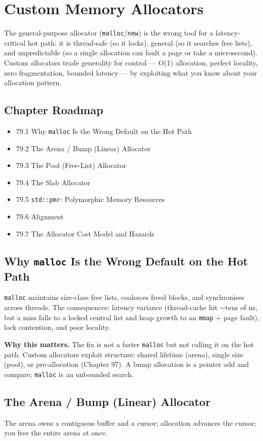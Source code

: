 \chapter{Custom Memory Allocators}

The general-purpose allocator (\texttt{malloc}/\texttt{new}) is the wrong tool for a latency-critical hot path: it is thread-safe (so it locks), general (so it searches free lists), and unpredictable (so a single allocation can fault a page or take a microsecond). Custom allocators trade generality for control --- O(1) allocation, perfect locality, zero fragmentation, bounded latency --- by exploiting what you know about your allocation pattern.

\section*{Chapter Roadmap}
\begin{itemize}
\item 79.1 Why \texttt{malloc} Is the Wrong Default on the Hot Path
\item 79.2 The Arena / Bump (Linear) Allocator
\item 79.3 The Pool (Free-List) Allocator
\item 79.4 The Slab Allocator
\item 79.5 \texttt{std::pmr}: Polymorphic Memory Resources
\item 79.6 Alignment
\item 79.7 The Allocator Cost Model and Hazards
\end{itemize}

\section{Why \texttt{malloc} Is the Wrong Default on the Hot Path}
\texttt{malloc} maintains size-class free lists, coalesces freed blocks, and synchronises across threads. The consequences: latency variance (thread-cache hit $\sim$tens of ns, but a miss falls to a locked central list and heap growth to an \texttt{mmap} + page fault), lock contention, and poor locality.

\textbf{Why this matters.} The fix is not a faster \texttt{malloc} but not calling it on the hot path. Custom allocators exploit structure: shared lifetime (arena), single size (pool), or pre-allocation (Chapter 97). A bump allocation is a pointer add and compare; \texttt{malloc} is an unbounded search.

\section{The Arena / Bump (Linear) Allocator}
The arena owns a contiguous buffer and a cursor; allocation advances the cursor; you free the entire arena at once.

